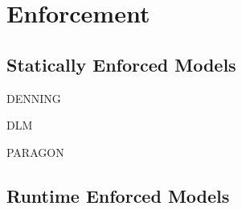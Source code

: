 \section{Enforcement}

\subsection{Statically Enforced Models} \label{if_static_models}

DENNING

DLM

PARAGON

\subsection{Runtime Enforced Models}




%
%


%
%
%
%
